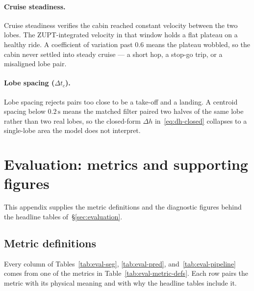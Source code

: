 \documentclass[manuscript,review,screen]{acmart}
\begin{document}
\paragraph{Cruise steadiness.}
Cruise steadiness verifies the cabin reached constant velocity
between the two lobes.  The ZUPT-integrated velocity in that window
holds a flat plateau on a healthy ride.  A coefficient of variation
past $0.6$ means the plateau wobbled, so the cabin never settled
into steady cruise --- a short hop, a stop-go trip, or a misaligned
lobe pair.

\paragraph{Lobe spacing ($\Delta t_c$).}
Lobe spacing rejects pairs too close to be a take-off and a landing.
A centroid spacing below $0.2\,\mathrm{s}$ means the matched filter
paired two halves of the same lobe rather than two real lobes, so
the closed-form $\Delta h$ in~\eqref{eq:dh-closed} collapses to a
single-lobe area the model does not interpret.

\clearpage
\section{Evaluation: metrics and supporting figures}
\label{app:evaluation}

This appendix supplies the metric definitions and the diagnostic
figures behind the headline tables of~\S\ref{sec:evaluation}.

\subsection{Metric definitions}
\label{app:eval-metrics}

Every column of Tables~\ref{tab:eval-seg}, \ref{tab:eval-pred},
and~\ref{tab:eval-pipeline} comes from one of the metrics in
Table~\ref{tab:eval-metric-defs}.  Each row pairs the metric with
its physical meaning and with why the headline tables include it.
\end{document}
